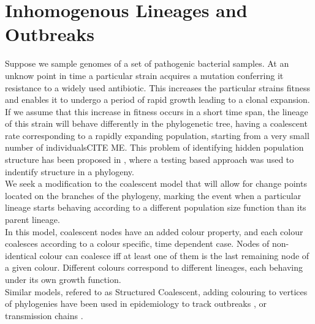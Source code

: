 \documentclass{report}
\newcommand{\CITEMISSING}{\colorbox{BurntOrange}{CITE ME}}
\theoremstyle{definition}
\begin{document}
\section{Inhomogenous Lineages and Outbreaks}\label{section:multi}
Suppose we sample genomes of a set of pathogenic bacterial samples. 
At an unknow point in time a particular strain acquires a mutation conferring it resistance to a widely used antibiotic. This increases the particular strains fitness and enables it to undergo a period of rapid growth leading to a clonal expansion. If we assume that this increase in fitness occurs in a short time span, the lineage of this strain will behave differently in the phylogenetic tree, having a coalescent rate corresponding to a rapidly expanding population, starting from a very small number of individuals\CITEMISSING. This problem of identifying hidden population structure has been proposed in \cite{volz_identification_nodate}, where a testing based approach was used to indentify structure in a phylogeny.\\

We seek a modification to the coalescent model that will allow for change points located on the branches of the phylogeny, marking the event when a particular lineage starts behaving according to a different population size function than its parent lineage.\\

In this model, coalescent nodes have an added colour property, and each colour coalesces according to a colour specific, time dependent case. Nodes of non-identical colour can coalesce iff at least one of them is the last remaining node of a given colour.
Different colours correspond to different lineages, each behaving under its own growth function.\\

Similar models, refered to as Structured Coalescent, adding colouring to vertices of phylogenies have been used in epidemiology to track outbreaks \cite{maio_scotti_2016}, or transmission chains \cite{didelot_genomic_2017}.
\end{document}
